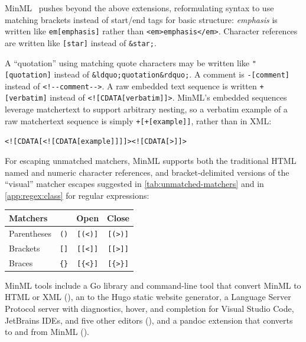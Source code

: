 MinML~\cite{anon-ford22minml} pushes beyond the above extensions,
reformulating \ml syntax
to use matching brackets
instead of start/end tags for basic structure:
\eg \emph{emphasis} is written like
\verb|em[emphasis]| rather than \verb|<em>emphasis</em>|.
Character references are written like
\verb|[star]| instead of \verb|&star;|.

A ``quotation'' using matching quote characters
may be written like
\verb|"[quotation]| instead of \verb|&ldquo;quotation&rdquo;|.
A comment is \verb|-[comment]| instead of \verb|<!--comment-->|.
A raw embedded text sequence
is written \verb|+[verbatim]| instead of \verb|<![CDATA[verbatim]]>|.
MinML's embedded sequences leverage matchertext
to support arbitrary nesting,
so a verbatim example of a raw matchertext sequence
is simply \verb|+[+[example]]|, rather than in XML:

\begin{footnotesize}
\begin{center}
\verb|<![CDATA[<![CDATA[example]]]]><![CDATA[>]]>|
\end{center}
\end{footnotesize}

For escaping unmatched matchers,
MinML supports both the traditional HTML named and numeric character references,
and bracket-delimited versions of the ``visual'' matcher escapes
suggested in \cref{tab:unmatched-matchers}
and in \cref{app:regex:class} for regular expressions:

\begin{center}
\begin{tabular}{lccc}
Matchers	&		& Open		& Close		\\
\hline
Parentheses	& \verb|()|	& \verb|[(<)]|	& \verb|[(>)]|	\\
Brackets	& \verb|[]|	& \verb|[[<]]|	& \verb|[[>]]|	\\
Braces		& \verb|{}|	& \verb|[{<}]|	& \verb|[{>}]|	\\
\end{tabular}
\end{center}

MinML tools include
a Go library and command-line tool that convert MinML to HTML or XML
(),
an 
to the Hugo static website generator,
a Language Server Protocol server with diagnostics, hover, and completion
for Visual Studio Code, JetBrains IDEs, and five other editors
(),
and a pandoc extension that converts to and from MinML
().

